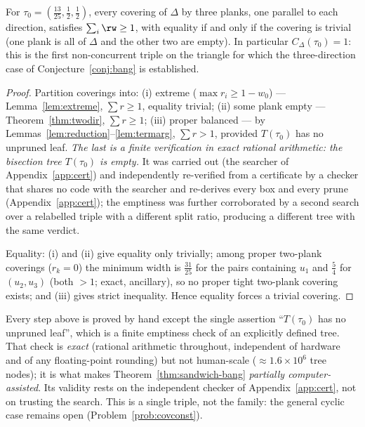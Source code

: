 \begin{theorem}[$C_\Delta(\tau_0)=1$; partially computer-assisted]
\label{thm:sandwich-bang}
For $\tau_0=(\tfrac{13}{25},\tfrac12,\tfrac12)$, every covering of $\Delta$ by
three planks, one parallel to each direction, satisfies $\sum_i\rw\ge1$, with
equality if and only if the covering is trivial (one plank is all of $\Delta$
and the other two are empty). In particular $C_\Delta(\tau_0)=1$: this is the
first non-concurrent triple on the triangle for which the three-direction case
of Conjecture~\ref{conj:bang} is established.
\end{theorem}
\begin{proof}
Partition coverings into: (i) extreme ($\max r_i\ge1-w_0$) ---
Lemma~\ref{lem:extreme}, $\sum r\ge1$, equality trivial; (ii) some plank empty
--- Theorem~\ref{thm:twodir}, $\sum r\ge1$; (iii) proper balanced --- by
Lemmas~\ref{lem:reduction}--\ref{lem:termarg}, $\sum r>1$, provided
$T(\tau_0)$ has no unpruned leaf. \emph{The last is a finite verification in
exact rational arithmetic: the bisection tree $T(\tau_0)$ is empty.} It was
carried out (the searcher of Appendix~\ref{app:cert}) and independently
re-verified from a certificate by a checker that shares no code with the
searcher and re-derives every box and every prune (Appendix~\ref{app:cert});
the emptiness was further corroborated by a second search over a relabelled
triple with a different split ratio, producing a different tree with the same
verdict.

Equality: (i) and (ii) give equality only trivially; among proper two-plank
coverings ($r_k=0$) the minimum width is $\tfrac{31}{25}$ for the pairs
containing $u_1$ and $\tfrac54$ for $(u_2,u_3)$ (both $>1$; exact, ancillary),
so no proper tight two-plank covering exists; and (iii) gives strict
inequality. Hence equality forces a trivial covering.
\end{proof}

\begin{remark}\label{rem:boundary}
Every step above is proved by hand except the single assertion ``$T(\tau_0)$
has no unpruned leaf'', which is a finite emptiness check of an explicitly
defined tree. That check is \emph{exact} (rational arithmetic throughout,
independent of hardware and of any floating-point rounding) but not
human-scale ($\approx1.6\times10^6$ tree nodes); it is what makes
Theorem~\ref{thm:sandwich-bang} \emph{partially computer-assisted}. Its
validity rests on the independent checker of Appendix~\ref{app:cert}, not on
trusting the search. This is a single triple, not the family: the general
cyclic case remains open (Problem~\ref{prob:covconst}).
\end{remark}
